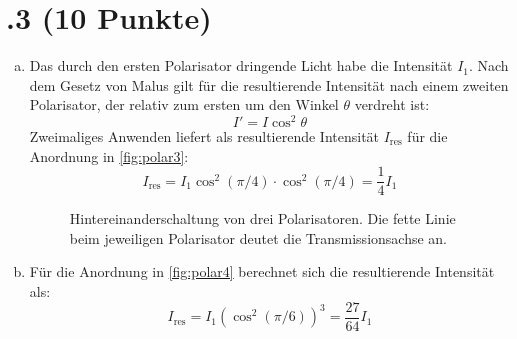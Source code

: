 \section*{\nr.3 \titthree (10 Punkte)}
\begin{enumerate}[(a)]
\item
Das durch den ersten Polarisator dringende Licht habe die Intensität $I_1$. Nach dem Gesetz von Malus gilt für die resultierende Intensität nach einem zweiten Polarisator, der relativ zum ersten um den Winkel $\theta$ verdreht ist:
\begin{equation}
I' = I \cos^2{\theta}
\end{equation}
Zweimaliges Anwenden liefert als resultierende Intensität $I_\text{res}$ für die Anordnung in \vref{fig:polar3}:
\begin{equation}
I_\text{res} = I_1 \cos^2{(\pi/4)} \cdot \cos^2{(\pi/4)} = \frac{1}{4}I_1
\end{equation}
\begin{figure}[htbp]
\centering
{}
\caption{Hintereinanderschaltung von drei Polarisatoren. Die fette Linie beim jeweiligen Polarisator deutet die Transmissionsachse an.}
\label{fig:polar3}
\end{figure}
\item
Für die Anordnung in \vref{fig:polar4} berechnet sich die resultierende Intensität als:
\begin{equation}
I_\text{res} = I_1 \left(\cos^2{(\pi/6)}\right)^3 = \frac{27}{64} I_1
\end{equation}
\begin{figure}[htbp]
\centering
{}
\end{figure}
\end{enumerate}
